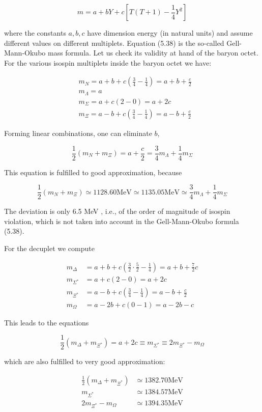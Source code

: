 \documentclass[10pt, letterpaper]{article}
\begin{document}
$$
m=a+b Y+c\left[T(T+1)-\frac{1}{4} Y^{2}\right]
$$

where the constants $a, b, c$ have dimension energy (in natural units) and assume different values on different multiplets. Equation (5.38) is the so-called Gell-Mann-Okubo mass formula. Let us check its validity at hand of the baryon octet. For the various isospin multiplets inside the baryon octet we have:

$$
\begin{aligned}
& m_{N}=a+b+c\left(\frac{3}{4}-\frac{1}{4}\right)=a+b+\frac{c}{2} \\
& m_{\Lambda}=a \\
& m_{\Sigma}=a+c(2-0)=a+2 c \\
& m_{\Xi}=a-b+c\left(\frac{3}{4}-\frac{1}{4}\right)=a-b+\frac{c}{2}
\end{aligned}
$$

Forming linear combinations, one can eliminate $b$,

$$
\frac{1}{2}\left(m_{N}+m_{\Xi}\right)=a+\frac{c}{2}=\frac{3}{4} m_{\Lambda}+\frac{1}{4} m_{\Sigma}
$$

This equation is fulfilled to good approximation, because

$$
\frac{1}{2}\left(m_{N}+m_{\Xi}\right) \simeq 1128.60 \mathrm{MeV} \simeq 1135.05 \mathrm{MeV} \simeq \frac{3}{4} m_{\Lambda}+\frac{1}{4} m_{\Sigma}
$$

The deviation is only 6.5 MeV , i.e., of the order of magnitude of isospin violation, which is not taken into account in the Gell-Mann-Okubo formula (5.38).

For the decuplet we compute

$$
\begin{aligned}
m_{\Delta} & =a+b+c\left(\frac{3}{2} \cdot \frac{5}{2}-\frac{1}{4}\right)=a+b+\frac{7}{2} c \\
m_{\Sigma^{*}} & =a+c(2-0)=a+2 c \\
m_{\Xi^{*}} & =a-b+c\left(\frac{3}{4}-\frac{1}{4}\right)=a-b+\frac{c}{2} \\
m_{\Omega} & =a-2 b+c(0-1)=a-2 b-c
\end{aligned}
$$

This leads to the equations

$$
\frac{1}{2}\left(m_{\Delta}+m_{\Xi^{*}}\right)=a+2 c \equiv m_{\Sigma^{*}} \equiv 2 m_{\Xi^{*}}-m_{\Omega}
$$

which are also fulfilled to very good approximation:

$$
\begin{aligned}
\frac{1}{2}\left(m_{\Delta}+m_{\Xi^{*}}\right) & \simeq 1382.70 \mathrm{MeV} \\
m_{\Sigma^{*}} & \simeq 1384.57 \mathrm{MeV} \\
2 m_{\Xi^{*}}-m_{\Omega} & \simeq 1394.35 \mathrm{MeV}
\end{aligned}
$$
\end{document}
